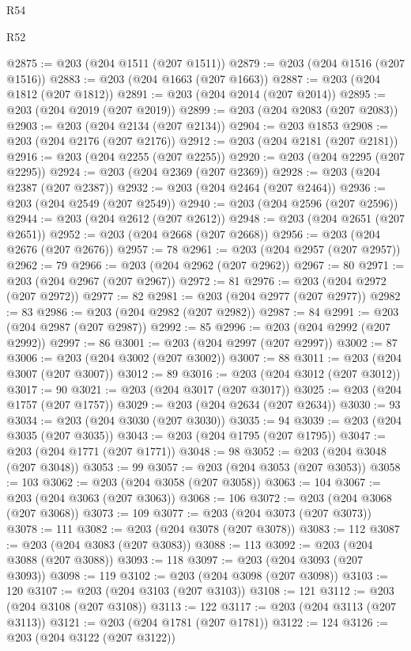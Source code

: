 \begin{lexlean}{R54}
\begin{lexlean}{R52}
\begin{coremodule}
{{{{{{{{{{{{{{{{{{{{{{{{{{{{{{{{{{{{{{{{{{{{{{{{{{{{{{{{{{{{{{{{{{{{{{{{{{{{{{{{{{{{{{{{{{{{{{{{{{{{{{{{{{{{{{{{{{{{{{{{{{{{{{{{{{{{{{{{{{{{{{{{{{{{{{{{{{{{{{{{{{{{{{{{{{{{{{{{{{{{{{{{{{{{{{{{{{{{{{@2875 := @203 (@204 @1511 (@207 @1511))
@2879 := @203 (@204 @1516 (@207 @1516))
@2883 := @203 (@204 @1663 (@207 @1663))
@2887 := @203 (@204 @1812 (@207 @1812))
@2891 := @203 (@204 @2014 (@207 @2014))
@2895 := @203 (@204 @2019 (@207 @2019))
@2899 := @203 (@204 @2083 (@207 @2083))
@2903 := @203 (@204 @2134 (@207 @2134))
@2904 := @203 @1853
@2908 := @203 (@204 @2176 (@207 @2176))
@2912 := @203 (@204 @2181 (@207 @2181))
@2916 := @203 (@204 @2255 (@207 @2255))
@2920 := @203 (@204 @2295 (@207 @2295))
@2924 := @203 (@204 @2369 (@207 @2369))
@2928 := @203 (@204 @2387 (@207 @2387))
@2932 := @203 (@204 @2464 (@207 @2464))
@2936 := @203 (@204 @2549 (@207 @2549))
@2940 := @203 (@204 @2596 (@207 @2596))
@2944 := @203 (@204 @2612 (@207 @2612))
@2948 := @203 (@204 @2651 (@207 @2651))
@2952 := @203 (@204 @2668 (@207 @2668))
@2956 := @203 (@204 @2676 (@207 @2676))
@2957 := 78
@2961 := @203 (@204 @2957 (@207 @2957))
@2962 := 79
@2966 := @203 (@204 @2962 (@207 @2962))
@2967 := 80
@2971 := @203 (@204 @2967 (@207 @2967))
@2972 := 81
@2976 := @203 (@204 @2972 (@207 @2972))
@2977 := 82
@2981 := @203 (@204 @2977 (@207 @2977))
@2982 := 83
@2986 := @203 (@204 @2982 (@207 @2982))
@2987 := 84
@2991 := @203 (@204 @2987 (@207 @2987))
@2992 := 85
@2996 := @203 (@204 @2992 (@207 @2992))
@2997 := 86
@3001 := @203 (@204 @2997 (@207 @2997))
@3002 := 87
@3006 := @203 (@204 @3002 (@207 @3002))
@3007 := 88
@3011 := @203 (@204 @3007 (@207 @3007))
@3012 := 89
@3016 := @203 (@204 @3012 (@207 @3012))
@3017 := 90
@3021 := @203 (@204 @3017 (@207 @3017))
@3025 := @203 (@204 @1757 (@207 @1757))
@3029 := @203 (@204 @2634 (@207 @2634))
@3030 := 93
@3034 := @203 (@204 @3030 (@207 @3030))
@3035 := 94
@3039 := @203 (@204 @3035 (@207 @3035))
@3043 := @203 (@204 @1795 (@207 @1795))
@3047 := @203 (@204 @1771 (@207 @1771))
@3048 := 98
@3052 := @203 (@204 @3048 (@207 @3048))
@3053 := 99
@3057 := @203 (@204 @3053 (@207 @3053))
@3058 := 103
@3062 := @203 (@204 @3058 (@207 @3058))
@3063 := 104
@3067 := @203 (@204 @3063 (@207 @3063))
@3068 := 106
@3072 := @203 (@204 @3068 (@207 @3068))
@3073 := 109
@3077 := @203 (@204 @3073 (@207 @3073))
@3078 := 111
@3082 := @203 (@204 @3078 (@207 @3078))
@3083 := 112
@3087 := @203 (@204 @3083 (@207 @3083))
@3088 := 113
@3092 := @203 (@204 @3088 (@207 @3088))
@3093 := 118
@3097 := @203 (@204 @3093 (@207 @3093))
@3098 := 119
@3102 := @203 (@204 @3098 (@207 @3098))
@3103 := 120
@3107 := @203 (@204 @3103 (@207 @3103))
@3108 := 121
@3112 := @203 (@204 @3108 (@207 @3108))
@3113 := 122
@3117 := @203 (@204 @3113 (@207 @3113))
@3121 := @203 (@204 @1781 (@207 @1781))
@3122 := 124
@3126 := @203 (@204 @3122 (@207 @3122))
}}}}}}}}}}}}}}}}}}}}}}}}}}}}}}}}}}}}}}}}}}}}}}}}}}}}}}}}}}}}}}}}}}}}}}}}}}}}}}}}}}}}}}}}}}}}}}}}}}}}}}}}}}}}}}}}}}}}}}}}}}}}}}}}}}}}}}}}}}}}}}}}}}}}}}}}}}}}}}}}}}}}}}}}}}}}}}}}}}}}}}}}}}}}}}}}}}}}}}
\end{coremodule}
\end{lexlean}
\end{lexlean}
